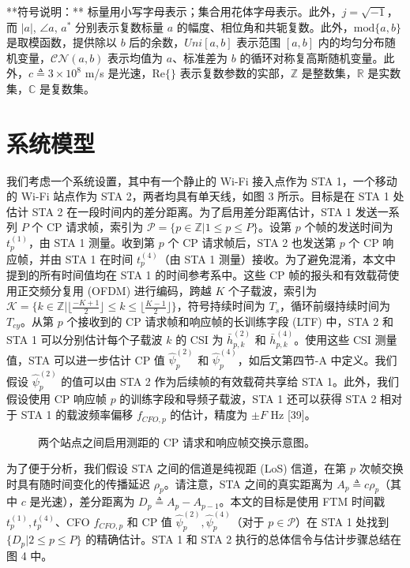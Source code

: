 \documentclass[journal]{IEEEtran}
\begin{document}
**符号说明：** 标量用小写字母表示；集合用花体字母表示。此外，$j=\sqrt{-1}$，而 $|a|$, $\angle a$, $a^*$ 分别表示复数标量 $a$ 的幅度、相位角和共轭复数。此外，$\text{mod}\{a, b\}$ 是取模函数，提供除以 $b$ 后的余数，$Uni[a, b]$ 表示范围 $[a, b]$ 内的均匀分布随机变量，$\mathcal{CN}(a, b)$ 表示均值为 $a$、标准差为 $b$ 的循环对称复高斯随机变量。此外，$c \triangleq 3 \times 10^8$ m/s 是光速，$\text{Re}\{\}$ 表示复数参数的实部，$\mathbb{Z}$ 是整数集，$\mathbb{R}$ 是实数集，$\mathbb{C}$ 是复数集。

\section{系统模型}
我们考虑一个系统设置，其中有一个静止的 Wi-Fi 接入点作为 STA 1，一个移动的 Wi-Fi 站点作为 STA 2，两者均具有单天线，如图 3 所示。目标是在 STA 1 处估计 STA 2 在一段时间内的差分距离。为了启用差分距离估计，STA 1 发送一系列 $P$ 个 CP 请求帧，索引为 $\mathcal{P} = \{p \in \mathbb{Z} | 1 \le p \le P\}$。设第 $p$ 个帧的发送时间为 $t_p^{(1)}$，由 STA 1 测量。收到第 $p$ 个 CP 请求帧后，STA 2 也发送第 $p$ 个 CP 响应帧，并由 STA 1 在时间 $t_p^{(4)}$（由 STA 1 测量）接收。为了避免混淆，本文中提到的所有时间值均在 STA 1 的时间参考系中。这些 CP 帧的报头和有效载荷使用正交频分复用 (OFDM) 进行编码，跨越 $K$ 个子载波，索引为 $\mathcal{K} = \{k \in \mathbb{Z} | \lfloor \frac{-K+1}{2} \rfloor \le k \le \lfloor \frac{K-1}{2} \rfloor\}$，符号持续时间为 $T_s$，循环前缀持续时间为 $T_{cy}$。从第 $p$ 个接收到的 CP 请求帧和响应帧的长训练字段 (LTF) 中，STA 2 和 STA 1 可以分别估计每个子载波 $k$ 的 CSI 为 $\bar{h}_{p,k}^{(2)}$ 和 $\bar{h}_{p,k}^{(4)}$。使用这些 CSI 测量值，STA 可以进一步估计 CP 值 $\hat{\psi}_p^{(2)}$ 和 $\hat{\psi}_p^{(4)}$，如后文第四节-A 中定义。我们假设 $\hat{\psi}_p^{(2)}$ 的值可以由 STA 2 作为后续帧的有效载荷共享给 STA 1。此外，我们假设使用 CP 响应帧 $p$ 的训练字段和导频子载波，STA 1 还可以获得 STA 2 相对于 STA 1 的载波频率偏移 $f_{CFO,p}$ 的估计，精度为 $\pm F$ Hz [39]。

\begin{figure}[htbp]
\centering
{}
\caption{两个站点之间启用测距的 CP 请求和响应帧交换示意图。}
\label{fig:fig3}
\end{figure}

为了便于分析，我们假设 STA 之间的信道是纯视距 (LoS) 信道，在第 $p$ 次帧交换时具有随时间变化的传播延迟 $\rho_p$。请注意，STA 之间的真实距离为 $A_p \triangleq c \rho_p$（其中 $c$ 是光速），差分距离为 $D_p \triangleq A_p - A_{p-1}$。本文的目标是使用 FTM 时间戳 $t_p^{(1)}, t_p^{(4)}$、CFO $f_{CFO,p}$ 和 CP 值 $\hat{\psi}_p^{(2)}, \hat{\psi}_p^{(4)}$（对于 $p \in \mathcal{P}$）在 STA 1 处找到 $\{D_p | 2 \le p \le P\}$ 的精确估计。STA 1 和 STA 2 执行的总体信令与估计步骤总结在图 4 中。
\end{document}
